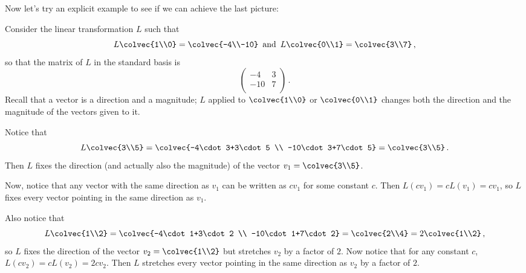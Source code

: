 Now let's try an explicit example to see if we can achieve the last picture:

\begin{example}
Consider the linear transformation $L$ such that \[L\colvec{1\\0}=\colvec{-4\\-10}\,  \mbox{ and }\, L\colvec{0\\1}=\colvec{3\\7}\, ,\] so that the matrix of $L$ in the standard basis is \[\begin{pmatrix}
-4 & 3 \\
-10 & 7 \\
\end{pmatrix}\, .\]  Recall that a vector is a direction and a magnitude; $L$ applied to $\colvec{1\\0}$ or $\colvec{0\\1}$ changes both the direction and the magnitude of the vectors given to it.

Notice that \[L\colvec{3\\5}=\colvec{-4\cdot 3+3\cdot 5 \\ -10\cdot 3+7\cdot 5}=\colvec{3\\5}\, .\]  Then $L$ fixes the  direction (and actually also the magnitude) of the vector $v_1=\colvec{3\\5}$.  





Now, notice that any vector with the same direction as $v_1$ can be written as $cv_1$ for some constant $c$.  Then $L(cv_1)=cL(v_1)=cv_1$, so $L$ fixes every vector pointing in the same direction as $v_1$.

Also notice that \[L\colvec{1\\2}=\colvec{-4\cdot 1+3\cdot 2 \\ -10\cdot 1+7\cdot 2}=\colvec{2\\4}=2\colvec{1\\2}\, ,\] so $L$ fixes the direction of the vector $v_2=\colvec{1\\2}$ but stretches $v_2$ by a factor of $2$.  Now notice that for any constant $c$, $L(cv_2)=cL(v_2)=2cv_2$.  Then $L$ stretches every vector pointing in the same direction as $v_2$ by a factor of $2$.

\end{example}

